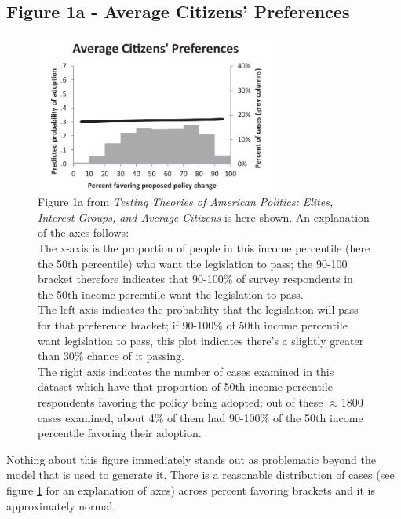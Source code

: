 \documentclass[]{article}
\begin{document}
\subsection{Figure 1a - Average Citizens' Preferences}
\begin{figure}[H]
	\begin{center}
		\includegraphics[width=300px]{./figures/paper/average-citizens-preferences.png}
	\end{center}	
	\caption{Figure 1a from \textit{Testing Theories of American Politics: Elites, Interest Groups, and Average Citizens} is here shown. An explanation of the axes follows: \\The x-axis is the proportion of people in this income percentile (here the 50th percentile) who want the legislation to pass; the 90-100 bracket therefore indicates that 90-100\% of survey respondents in the 50th income percentile want the legislation to pass. \\The left axis indicates the probability that the legislation will pass for that preference bracket; if 90-100\% of 50th income percentile want legislation to pass, this plot indicates there's a slightly greater than 30\% chance of it passing. \\The right axis indicates the number of cases examined in this dataset which have that proportion of 50th income percentile respondents favoring the policy being adopted; out of these $\approx$1800 cases examined, about 4\% of them had 90-100\% of the 50th income percentile favoring their adoption.}
	\label{paper_figure1a}
\end{figure}

Nothing about this figure immediately stands out as problematic beyond the model that is used to generate it. There is a reasonable distribution of cases (see figure \ref{paper_figure1a} for an explanation of axes) across percent favoring brackets and it is approximately normal.
\end{document}
